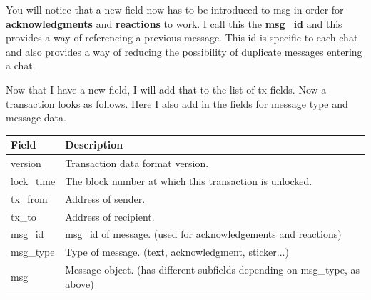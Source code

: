\documentclass{article}
\begin{document}
You will notice that a new field now has to be introduced to msg in order for \textbf{acknowledgments} and \textbf{reactions} to work. I call this the \textbf{msg\_id} and this provides a way of referencing a previous message. This id is specific to each chat and also provides a way of reducing the possibility of duplicate messages entering a chat.

Now that I have a new field, I will add that to the list of tx fields. Now a transaction looks as follows. Here I also add in the fields for message type and message data.
\begin{table}[H]
\centering
\begin{tabular}{|p{2.5cm}|p{8.5cm}|}
\hline
\rowcolor{tblgrey}
Field & Description\\ \hline
version     & Transaction data format version.                              \\ \hline
lock\_time  & The block number at which this transaction is unlocked. \\ \hline
tx\_from    & Address of sender.                        \\ \hline
tx\_to      & Address of recipient.                                         \\ \hline
msg\_id     & msg\_id of message. (used for acknowledgements and reactions) \\ \hline
msg\_type   & Type of message. (text, acknowledgment, sticker...)          \\ \hline
msg         & Message object. (has different subfields depending on msg\_type, as above) \\ \hline
\end{tabular}
\end{table}

\newpage
\label{para:bf}
\end{document}

